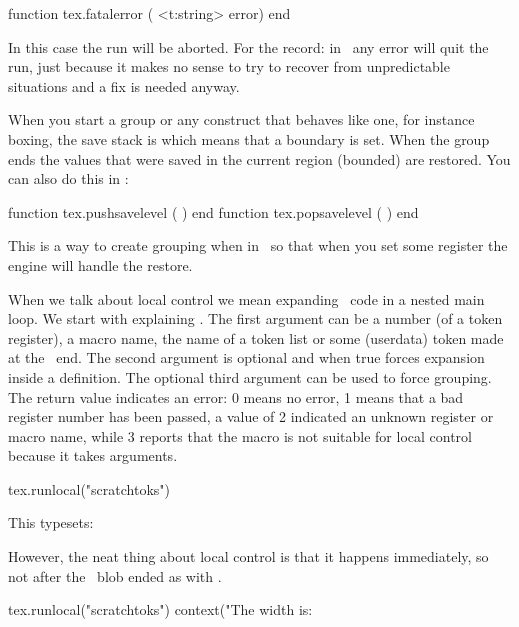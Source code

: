 \starttyping[option=LUA]
function tex.fatalerror ( <t:string> error) end
\stoptyping

In this case the run will be aborted. For the record: in \CONTEXT\ any error will
quit the run, just because it makes no sense to try to recover from unpredictable
situations and a fix is needed anyway.

\stopsubsection

\startsubsection[title=Save levels]

When you start a group or any construct that behaves like one, for instance
boxing, the save stack is  which means that a boundary is set.
When the group ends the values that were saved in the current region (bounded)
are restored. You can also do this in \LUA:

\starttyping[option=LUA]
function tex.pushsavelevel ( ) end
function tex.popsavelevel  ( ) end
\stoptyping

This is a way to create grouping when in \LUA\ so that when you set some register
the engine will handle the restore.

\stopsubsection

\startsubsection[title=Local control]

When we talk about local control we mean expanding \TEX\ code in a nested main
loop. We start with explaining . The first argument can be a
number (of a token register), a macro name, the name of a token list or some
(userdata) token made at the \LUA\ end. The second argument is optional and when
true forces expansion inside a definition. The optional third argument can be
used to force grouping. The return value indicates an error: 0 means no error, 1
means that a bad register number has been passed, a value of 2 indicated an
unknown register or macro name, while 3 reports that the macro is not suitable
for local control because it takes arguments.

\startbuffer
{}%
\startluacode
    tex.runlocal("scratchtoks")
\stopluacode
\stopbuffer

\typebuffer

This typesets: \inlinebuffer

However, the neat thing about local control is that it happens immediately, so not
after the \LUA\ blob ended as with .

\startbuffer
{}%
\startluacode
    tex.runlocal("scratchtoks")
    context("The width is: %
\stopluacode
\stopbuffer

